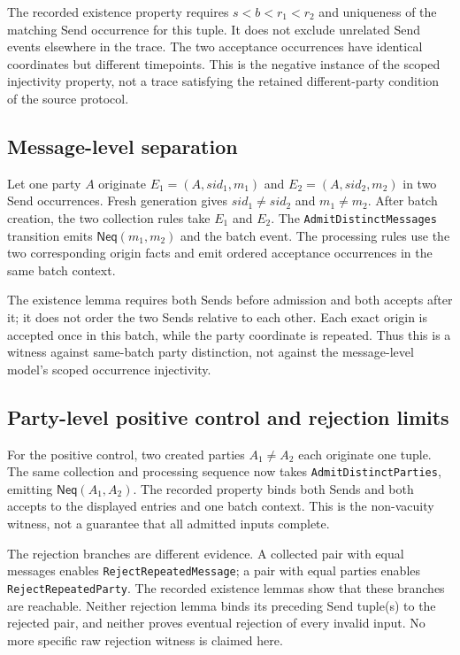 The recorded existence property requires $s<b<r_1<r_2$ and uniqueness of the
matching Send occurrence for this tuple. It does not exclude unrelated Send
events elsewhere in the trace. The two acceptance occurrences have identical
coordinates but different timepoints. This is the negative instance of the
scoped injectivity property, not a trace satisfying the retained different-party
condition of the source protocol.

\subsection{Message-level separation}

Let one party $A$ originate $E_1=(A,\mathit{sid}_1,m_1)$ and
$E_2=(A,\mathit{sid}_2,m_2)$ in two Send occurrences. Fresh generation gives
$\mathit{sid}_1\neq\mathit{sid}_2$ and $m_1\neq m_2$. After batch creation,
the two collection rules take $E_1$ and $E_2$. The
\texttt{AdmitDistinctMessages} transition emits $\mathsf{Neq}(m_1,m_2)$ and
the batch event. The processing rules use the two corresponding origin facts
and emit ordered acceptance occurrences in the same batch context.

The existence lemma requires both Sends before admission and both accepts
after it; it does not order the two Sends relative to each other. Each exact
origin is accepted once in this batch, while the party coordinate is repeated.
Thus this is a witness against same-batch party distinction, not against the
message-level model's scoped occurrence injectivity.

\subsection{Party-level positive control and rejection limits}

For the positive control, two created parties $A_1\neq A_2$ each originate
one tuple. The same collection and processing sequence now takes
\texttt{AdmitDistinctParties}, emitting $\mathsf{Neq}(A_1,A_2)$.
The recorded  property binds both Sends
and both accepts to the displayed entries and one batch context. This is the
non-vacuity witness, not a guarantee that all admitted inputs complete.

The rejection branches are different evidence. A collected pair with equal
messages enables \texttt{RejectRepeatedMessage}; a pair with equal parties
enables \texttt{RejectRepeatedParty}. The recorded existence lemmas show that
these branches are reachable. Neither rejection lemma binds its preceding
Send tuple(s) to the rejected pair, and neither proves eventual rejection of
every invalid input. No more specific raw rejection witness is claimed here.
